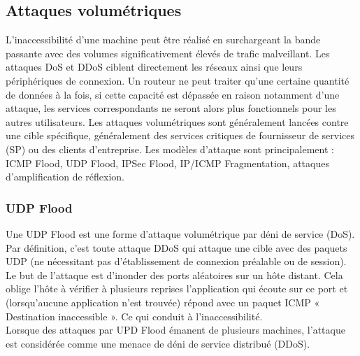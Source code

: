 	
	\pagebreak
	\subsection{Attaques volumétriques}
	L’inaccessibilité d’une machine peut être réalisé en surchargeant la bande passante avec des volumes significativement élevés de trafic malveillant. Les attaques DoS et DDoS ciblent directement les réseaux ainsi que leurs périphériques de connexion. Un routeur ne peut traiter qu’une certaine quantité de données à la fois, si cette capacité est dépassée en raison notamment d’une attaque, les services correspondants ne seront alors plus fonctionnels pour les autres utilisateurs.
Les attaques volumétriques sont généralement lancées contre une cible spécifique, généralement des services critiques de fournisseur de services (SP) ou des clients d'entreprise. Les modèles d’attaque sont principalement : ICMP Flood, UDP Flood, IPSec Flood, IP/ICMP Fragmentation, attaques d’amplification de réflexion. 

	\subsubsection{UDP Flood}
	Une UDP Flood est une forme d'attaque volumétrique par déni de service (DoS). Par définition, c’est toute attaque DDoS qui attaque une cible avec des paquets UDP (ne nécessitant pas d’établissement de connexion préalable ou de session). Le but de l'attaque est d'inonder des ports aléatoires sur un hôte distant. Cela oblige l'hôte à vérifier à plusieurs reprises l'application qui écoute sur ce port et (lorsqu'aucune application n'est trouvée) répond avec un paquet ICMP « Destination inaccessible »\cite{impervaddos}. Ce qui conduit à l’inaccessibilité.\\

	Lorsque des attaques par UPD Flood émanent de plusieurs machines, l'attaque est considérée comme une menace de déni de service distribué (DDoS).

